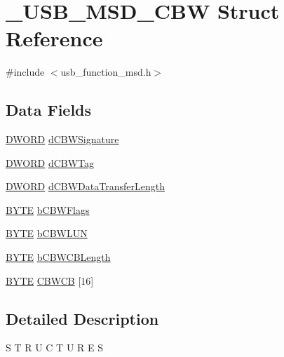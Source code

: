 \hypertarget{struct___u_s_b___m_s_d___c_b_w}{}\section{\+\_\+\+U\+S\+B\+\_\+\+M\+S\+D\+\_\+\+C\+B\+W Struct Reference}
\label{struct___u_s_b___m_s_d___c_b_w}


{\ttfamily \#include $<$usb\+\_\+function\+\_\+msd.\+h$>$}

\subsection*{Data Fields}
\begin{DoxyCompactItemize}
\item 
\hyperlink{_generic_type_defs_8h_ad342ac907eb044443153a22f964bf0af}{D\+W\+O\+R\+D} \hyperlink{struct___u_s_b___m_s_d___c_b_w_af557d18509ac8957331291f6c67d322a}{d\+C\+B\+W\+Signature}
\item 
\hyperlink{_generic_type_defs_8h_ad342ac907eb044443153a22f964bf0af}{D\+W\+O\+R\+D} \hyperlink{struct___u_s_b___m_s_d___c_b_w_aa3f959927fe99de593e05ed62b2661a6}{d\+C\+B\+W\+Tag}
\item 
\hyperlink{_generic_type_defs_8h_ad342ac907eb044443153a22f964bf0af}{D\+W\+O\+R\+D} \hyperlink{struct___u_s_b___m_s_d___c_b_w_a0f9225709abb8b57c1204912caca9d52}{d\+C\+B\+W\+Data\+Transfer\+Length}
\item 
\hyperlink{_generic_type_defs_8h_a4ae1dab0fb4b072a66584546209e7d58}{B\+Y\+T\+E} \hyperlink{struct___u_s_b___m_s_d___c_b_w_ad34147f761766fede578867ea6d85fcf}{b\+C\+B\+W\+Flags}
\item 
\hyperlink{_generic_type_defs_8h_a4ae1dab0fb4b072a66584546209e7d58}{B\+Y\+T\+E} \hyperlink{struct___u_s_b___m_s_d___c_b_w_a297eae8775e7d3fa1b7fcaeab32ac0c1}{b\+C\+B\+W\+L\+U\+N}
\item 
\hyperlink{_generic_type_defs_8h_a4ae1dab0fb4b072a66584546209e7d58}{B\+Y\+T\+E} \hyperlink{struct___u_s_b___m_s_d___c_b_w_a0450c0ac2b531484aa894b5304685021}{b\+C\+B\+W\+C\+B\+Length}
\item 
\hyperlink{_generic_type_defs_8h_a4ae1dab0fb4b072a66584546209e7d58}{B\+Y\+T\+E} \hyperlink{struct___u_s_b___m_s_d___c_b_w_a887206556ae1cb5261a1703c2a3408de}{C\+B\+W\+C\+B} \mbox{[}16\mbox{]}
\end{DoxyCompactItemize}


\subsection{Detailed Description}
S T R U C T U R E S 

